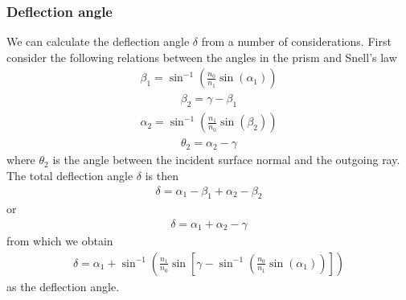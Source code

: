 \documentclass[letterpaper,10pt,english]{sphinxmanual}
\begin{document}
\subsubsection{Deflection angle}
\label{\detokenize{notebooks/L3/Optical Elements:Deflection-angle}}
We can calculate the deflection angle \(\delta\) from a number of considerations. First consider the following relations between the angles in the prism and Snell’s law
\begin{equation*}
\begin{split}\beta_1=\sin^{-1}\left (\frac{n_0}{n_1}\sin(\alpha_1) \right)\end{split}
\end{equation*}\begin{equation*}
\begin{split}\beta_2=\gamma-\beta_1\end{split}
\end{equation*}\begin{equation*}
\begin{split}\alpha_2=\sin^{-1}\left (\frac{n_1}{n_0}\sin(\beta_2)\right )\end{split}
\end{equation*}\begin{equation*}
\begin{split}\theta_2=\alpha_2-\gamma\end{split}
\end{equation*}
where \(\theta_2\) is the angle between the incident surface normal and the outgoing ray. The total deflection angle \(\delta\) is then
\begin{equation*}
\begin{split}\delta =\alpha_1-\beta_1+\alpha_2-\beta_2\end{split}
\end{equation*}
or
\begin{equation*}
\begin{split}\delta =\alpha_1+\alpha_2-\gamma\end{split}
\end{equation*}
from which we obtain
\begin{equation*}
\begin{split}\delta=\alpha_1+\sin^{-1}\left (\frac{n_1}{n_0}\sin\left [\gamma-\sin^{-1}\left (\frac{n_0}{n_1}\sin(\alpha_1) \right)\right]\right )\end{split}
\end{equation*}
as the deflection angle.
\end{document}
